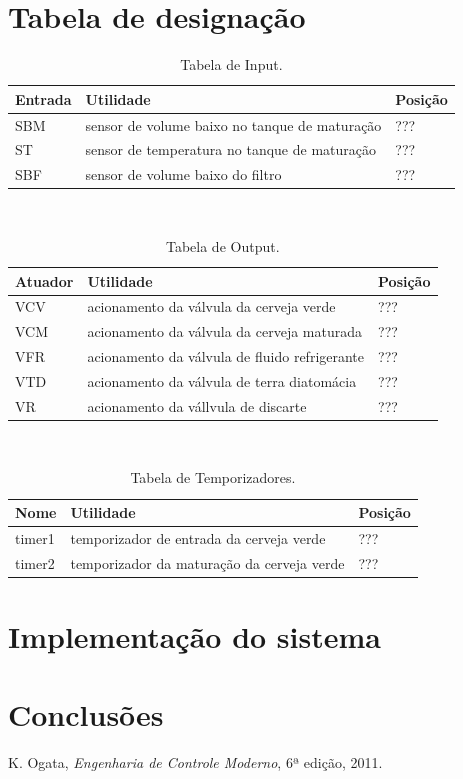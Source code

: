 \documentclass[12pt]{article}
\begin{document}
\section {Tabela de designação}
{
\begin {table}
\caption {Tabela de Input.}
\centering
	\begin{tabular}{|  p{2cm} | p{10cm} | p{2cm} | }
\hline
Entrada & Utilidade & Posição\\
\hline
SBM & sensor de volume baixo no tanque de maturação & ??? \\
  ST & sensor de temperatura no tanque de maturação & ??? \\
 SBF & sensor de volume baixo do filtro & ??? \\
\hline
\end{tabular}\\
\end {table}
}


{
\begin {table}
\caption {Tabela de Output.}
\centering
\begin{tabular}{|  p{2cm} | p{10cm} | p{2cm} | }
\hline
Atuador & Utilidade & Posição\\
\hline
  VCV & acionamento da válvula da cerveja verde & ??? \\
  VCM & acionamento da válvula da cerveja maturada & ??? \\
 VFR & acionamento da válvula de fluido refrigerante & ??? \\
VTD & acionamento da válvula de terra diatomácia & ???\\
VR & acionamento da vállvula de discarte & ???\\
 \hline
\end{tabular}\\
\end{table}
}


{
\begin {table}
\caption {Tabela de Temporizadores.}
\centering
\begin{tabular}{|  p{2cm} | p{10cm} | p{2cm} | }
\hline
Nome & Utilidade & Posição\\
\hline
timer1 &  temporizador de entrada da cerveja verde & ??? \\
 timer2 & temporizador da maturação da cerveja verde & ??? \\
 \hline
\end{tabular}
\end{table}
}

\section {Implementação do sistema}


\section {Conclusões}


\begin{thebibliography}{5}
	
	 K. Ogata, \emph{Engenharia de Controle Moderno}, 6ª edição, 2011.
	
\end{thebibliography}
\end{document}
